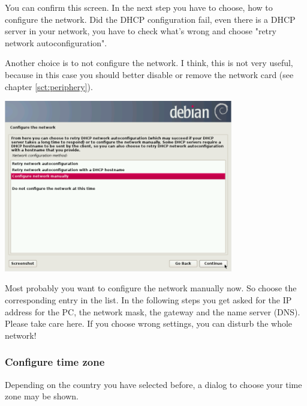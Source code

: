 \documentclass[a4paper,12pt,twoside]{article}
\begin{document}
You can confirm this screen. In the next step you have to choose, how to
configure the network. Did the DHCP configuration fail, even there is a
DHCP server in your network, you have to check what's
wrong and choose "retry network autoconfiguration".

Another choice is to not configure the network. I think, this is not
very useful, because in this case you should better disable or remove
the network card (see chapter \ref{sct:periphery}).

\bigskip
\begin{minipage}{\linewidth}
    \centering
    \includegraphics[width=10cm]{efaLiveen-img/efaLiveen-img8.png}
    \label{fig:network_manual}
\end{minipage}
\bigskip

Most probably you want to configure the network manually now. So choose
the corresponding entry in the list. In the following steps you get
asked for the IP address for the PC, the network mask, the gateway and
the name server (DNS). Please take care here. If you choose wrong
settings, you can disturb the whole network!


\subsubsection{Configure time zone}
\label{sct:inst_timezone}

Depending on the country you have selected before, a dialog to choose
your time zone may be shown.
\end{document}
